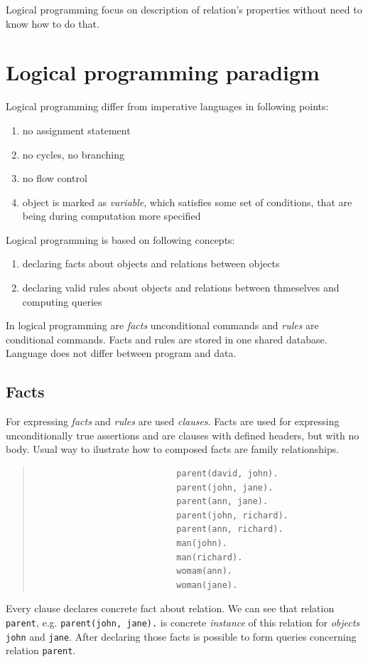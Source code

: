 \documentclass[11pt,twoside,a4paper]{book}
\begin{document}
Logical programming focus on description of relation's properties without need
to know how to do that.

\section{Logical programming paradigm}

Logical programming differ from imperative languages in following points:
\begin{enumerate}
  \item no assignment statement
  \item no cycles, no branching 
  \item no flow control
  \item object is marked as \textit{variable}, which satisfies some set of
  conditions, that are being during computation more specified
\end{enumerate}
Logical programming is based on following concepts:
\begin{enumerate}
  \item declaring facts about objects and relations between objects
  \item declaring valid rules about objects and relations between thmeselves and
  computing queries
\end{enumerate}
In logical programming are \textit{facts} unconditional commands and
\textit{rules} are conditional commands. Facts and rules are stored in one
shared database. Language does not differ between program and data.

\newpage
\subsection{Facts}
\label{sec:facts}
For expressing \textit{facts} and \textit{rules} are used \textit{clauses}.
Facts are used for expressing unconditionally true assertions and are clauses
with defined headers, but with no body. Usual way to ilustrate how to
composed facts are family relationships.

\begin{quote}
\begin{verbatim}
                            parent(david, john).
                            parent(john, jane).
                            parent(ann, jane).
                            parent(john, richard).
                            parent(ann, richard).
                            man(john).
                            man(richard).
                            womam(ann).
                            woman(jane).
\end{verbatim}
\end{quote}
Every clause declares concrete fact about relation. We can see that relation
\verb|parent|, e.g. \verb|parent(john, jane).| is concrete \textit{instance} of
this relation for \textit{objects} \verb|john| and \verb|jane|. After declaring
those facts is possible to form queries concerning relation \verb|parent|.
\end{document}
